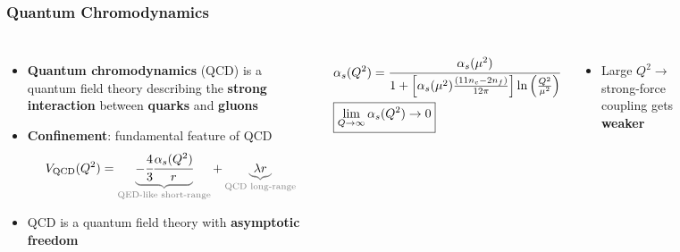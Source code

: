 \begin{frame}
  \frametitle{\textbf{Quantum Chromodynamics}}
  \begin{columns}
    \begin{itemize}
    \item \textbf{Quantum chromodynamics} (QCD) is a quantum field theory describing the \textbf{strong interaction} between \textbf{quarks} and \textbf{gluons}
    \item \textbf{Confinement}: fundamental feature of QCD
      \begin{align*}
        V_{\text{QCD}}(Q^2) = \color{gray}\underbrace{\color{black}-\cfrac{4}{3}\cfrac{\alpha_s(Q^2)}{r}}_{\text{QED-like short-range}} \color{black} + \color{gray} \underbrace{\color{black}\lambda r}_{\text{QCD long-range}}
      \end{align*}
    \item QCD is a quantum field theory with \textbf{asymptotic freedom}
    \end{itemize}
    \begin{align*}
      &\alpha_s(Q^2) = \cfrac{\alpha_s(\mu^2)}{1 + \left[\alpha_s(\mu^2)\frac{(11n_c - 2n_f)}{12\pi}\right]\ln\left(\frac{Q^2}{\mu^2}\right)} \\
      & \boxed{\lim_{Q \to \infty}\alpha_s(Q^2) \to 0}
    \end{align*}

    \begin{itemize}
    \item Large $Q^2 \to$ strong-force coupling gets \textbf{weaker}
    \end{itemize}



    \centering

    \

    \

    \begin{columns}



\end{columns}
\end{columns}
\end{frame}
